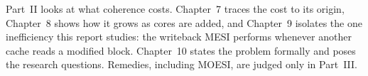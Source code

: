\begin{center}
\end{center}

\begin{keybox}
Part~II looks at what coherence costs. Chapter~7 traces the cost to its origin,
Chapter~8 shows how it grows as cores are added, and Chapter~9 isolates the one
inefficiency this report studies: the writeback MESI performs whenever another
cache reads a modified block. Chapter~10 states the problem formally and poses
the research questions. Remedies, including MOESI, are judged only in Part~III.
\end{keybox}
